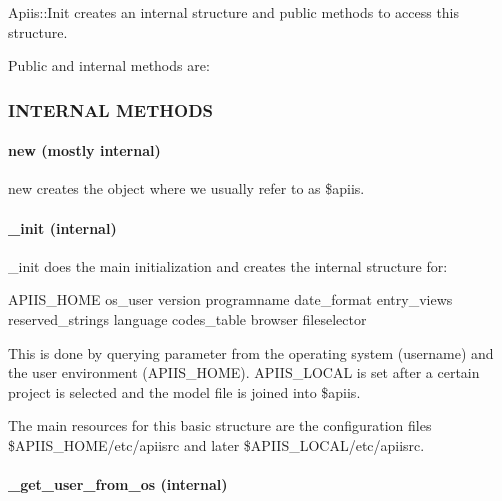 Apiis::Init creates an internal structure and public methods to access
this structure.



Public and internal methods are:

\subsubsection*{INTERNAL METHODS\label{Apiis::Init_--_Basic_initialisation_object_for_the_complete_APIIS_structure_INTERNAL_METHODS}}
\paragraph*{new (mostly internal)\label{Apiis::Init_--_Basic_initialisation_object_for_the_complete_APIIS_structure_new_mostly_internal_}}


new creates the object where we usually refer to as \$apiis.

\paragraph*{\_init (internal)\label{Apiis::Init_--_Basic_initialisation_object_for_the_complete_APIIS_structure__init_internal_}}


\_init does the main initialization and creates the internal structure for:



APIIS\_HOME os\_user version programname date\_format
entry\_views reserved\_strings language codes\_table browser fileselector



This is done by querying parameter from the operating system (username) and
the user environment (APIIS\_HOME). APIIS\_LOCAL is set after a certain
project is selected and the model file is joined into \$apiis.



The main resources for this basic structure are the configuration files
\$APIIS\_HOME/etc/apiisrc and later \$APIIS\_LOCAL/etc/apiisrc.

\paragraph*{\_get\_user\_from\_os (internal)\label{Apiis::Init_--_Basic_initialisation_object_for_the_complete_APIIS_structure__get_user_from_os_internal_}}


